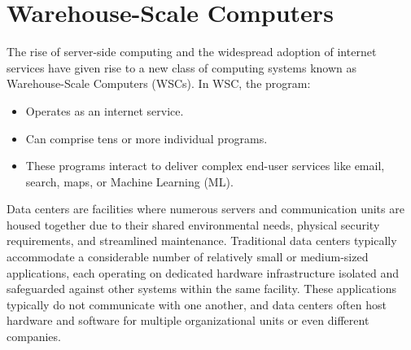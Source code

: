 \section{Warehouse-Scale Computers}

The rise of server-side computing and the widespread adoption of internet services have given rise to a new class of computing systems known as Warehouse-Scale Computers (WSCs). 
In WSC, the program:
\begin{itemize}
    \item Operates as an internet service.
    \item Can comprise tens or more individual programs.
    \item These programs interact to deliver complex end-user services like email, search, maps, or Machine Learning (ML).
\end{itemize}
Data centers are facilities where numerous servers and communication units are housed together due to their shared environmental needs, physical security requirements, and streamlined maintenance. 
Traditional data centers typically accommodate a considerable number of relatively small or medium-sized applications, each operating on dedicated hardware infrastructure isolated and safeguarded against other systems within the same facility. 
These applications typically do not communicate with one another, and data centers often host hardware and software for multiple organizational units or even different companies.

